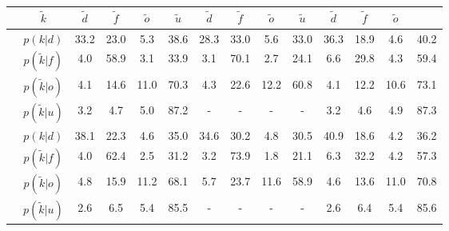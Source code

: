 \begin{center}
	\footnotesize
\begin{tabular}{c|c|cccc|cccc|cccc}
	&$\tilde{k}$ & $\tilde{d}$ & $\tilde{f}$ & $\tilde{o}$ & $\tilde{u}$ & $\tilde{d}$ & $\tilde{f}$ & $\tilde{o}$ & $\tilde{u}$ & $\tilde{d}$ & $\tilde{f}$ & $\tilde{o}$\\
	\hline
	\parbox[t]{2mm}{}&$p(k|d)$ & \textcolor{mygreen}{33.2} & \textcolor{myred}{23.0} & \textcolor{myred}{5.3} & 38.6 & \textcolor{mygreen}{28.3} & \textcolor{myred}{33.0} & \textcolor{myred}{5.6} & 33.0 & \textcolor{mygreen}{36.3} & \textcolor{myred}{18.9} & \textcolor{myred}{4.6} & 40.2\\
	&$p(\tilde{k}|f)$ & \textcolor{myred}{4.0} & \textcolor{mygreen}{58.9} & \textcolor{myred}{3.1} & 33.9 & \textcolor{myred}{3.1} & \textcolor{mygreen}{70.1} & \textcolor{myred}{2.7} & 24.1 & \textcolor{myred}{6.6} & \textcolor{mygreen}{29.8} & \textcolor{myred}{4.3} & 59.4\\
	&$p(\tilde{k}|o)$ & \textcolor{myred}{4.1} & \textcolor{myred}{14.6} & \textcolor{mygreen}{11.0} & 70.3 & \textcolor{myred}{4.3} & \textcolor{myred}{22.6} & \textcolor{mygreen}{12.2} & 60.8 & \textcolor{myred}{4.1} & \textcolor{myred}{12.2} & \textcolor{mygreen}{10.6} & 73.1\\
	&$p(\tilde{k}|u)$ & 3.2 & 4.7 & 5.0 & 87.2 & - & - & - & - & 3.2 & 4.6 & 4.9 & 87.3\\
	\hline
	\parbox[t]{2mm}{}&$p(k|d)$ & \textcolor{mygreen}{38.1} & \textcolor{myred}{22.3} & \textcolor{myred}{4.6} & 35.0 & \textcolor{mygreen}{34.6} & \textcolor{myred}{30.2} & \textcolor{myred}{4.8} & 30.5 & \textcolor{mygreen}{40.9} & \textcolor{myred}{18.6} & \textcolor{myred}{4.2} & 36.2\\
	&$p(\tilde{k}|f)$ & \textcolor{myred}{4.0} & \textcolor{mygreen}{62.4} & \textcolor{myred}{2.5} & 31.2 & \textcolor{myred}{3.2} & \textcolor{mygreen}{73.9} & \textcolor{myred}{1.8} & 21.1 & \textcolor{myred}{6.3} & \textcolor{mygreen}{32.2} & \textcolor{myred}{4.2} & 57.3\\
	&$p(\tilde{k}|o)$ & \textcolor{myred}{4.8} & \textcolor{myred}{15.9} & \textcolor{mygreen}{11.2} & 68.1 & \textcolor{myred}{5.7} & \textcolor{myred}{23.7} & \textcolor{mygreen}{11.6} & 58.9 & \textcolor{myred}{4.6} & \textcolor{myred}{13.6} & \textcolor{mygreen}{11.0} & 70.8\\
	&$p(\tilde{k}|u)$ & 2.6 & 6.5 & 5.4 & 85.5 & - & - & - & - & 2.6 & 6.4 & 5.4 & 85.6\\

\end{tabular}
\end{center}

